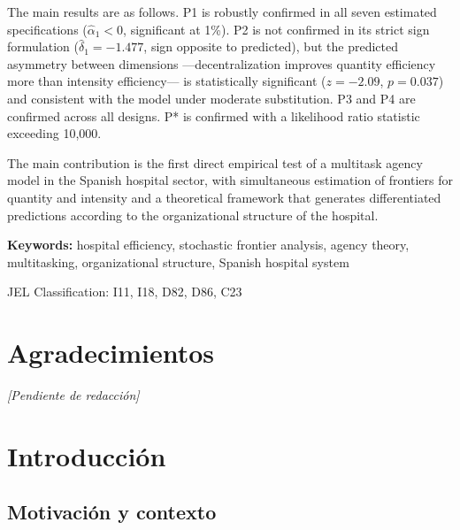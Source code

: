 \documentclass[12pt, a4paper, twoside, openright]{book}
\theoremstyle{plain}
\theoremstyle{definition}
\theoremstyle{remark}
\begin{document}
The main results are as follows. P1 is robustly confirmed in all seven estimated specifications ($\hat{\alpha}_1 < 0$, significant at 1\%). P2 is not confirmed in its strict sign formulation ($\hat{\delta}_1 = -1.477$, sign opposite to predicted), but the predicted asymmetry between dimensions ---decentralization improves quantity efficiency more than intensity efficiency--- is statistically significant ($z = -2.09$, $p = 0.037$) and consistent with the model under moderate substitution. P3 and P4 are confirmed across all designs. P* is confirmed with a likelihood ratio statistic exceeding 10,000.

The main contribution is the first direct empirical test of a multitask agency model in the Spanish hospital sector, with simultaneous estimation of frontiers for quantity and intensity and a theoretical framework that generates differentiated predictions according to the organizational structure of the hospital.

\medskip
\noindent\textbf{Keywords:} hospital efficiency, stochastic frontier analysis, agency theory, multitasking, organizational structure, Spanish hospital system

\medskip
\noindent JEL Classification: I11, I18, D82, D86, C23

\chapter*{Agradecimientos}
\vspace{2cm}
\begin{center}
\textit{[Pendiente de redacción]}
\end{center}

\tableofcontents
\listoftables
\listoffigures

\mainmatter



\chapter{Introducción}
\label{ch:intro}

\section{Motivación y contexto}
\end{document}
